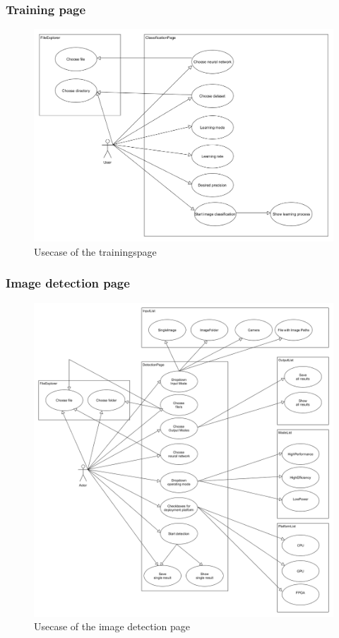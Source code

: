 \documentclass[parskip=full]{scrartcl}
\begin{document}
\subsubsection{Training page}
\begin{figure}[htb!]
\centering
\includegraphics[width=\textwidth]{TrainUsecase}
\caption{Usecase of the trainingspage}
\end{figure}
\clearpage
\subsubsection{Image detection page}
\begin{figure}[htb!]
\centering
\includegraphics[width=\textwidth]{objectDetectionUsecase}
\caption{Usecase of the image detection page}
\end{figure}
\newpage
\end{document}
